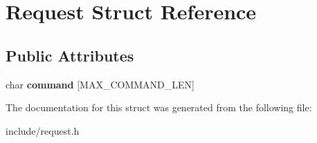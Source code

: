 \hypertarget{struct_request}{}\section{Request Struct Reference}
\label{struct_request}
\subsection*{Public Attributes}
\begin{DoxyCompactItemize}
\item 
\mbox{\label{struct_request_a3c36aa805e910a4573fe1af136667b48}} 
char {\bfseries command} \mbox{[}M\+A\+X\+\_\+\+C\+O\+M\+M\+A\+N\+D\+\_\+\+L\+EN\mbox{]}
\end{DoxyCompactItemize}


The documentation for this struct was generated from the following file\+:\begin{DoxyCompactItemize}
\item 
include/request.\+h\end{DoxyCompactItemize}
